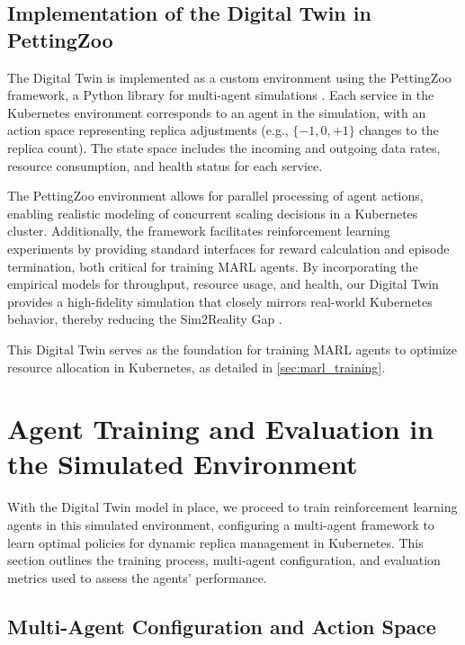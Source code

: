 \documentclass[conference]{IEEEtran}
\begin{document}
\subsection{Implementation of the Digital Twin in PettingZoo}

The Digital Twin is implemented as a custom environment using the PettingZoo framework, a Python library for multi-agent simulations \cite{pettingzoo_framework}. Each service in the Kubernetes environment corresponds to an agent in the simulation, with an action space representing replica adjustments (e.g., $\{-1, 0, +1\}$ changes to the replica count). The state space includes the incoming and outgoing data rates, resource consumption, and health status for each service.

The PettingZoo environment allows for parallel processing of agent actions, enabling realistic modeling of concurrent scaling decisions in a Kubernetes cluster. Additionally, the framework facilitates reinforcement learning experiments by providing standard interfaces for reward calculation and episode termination, both critical for training MARL agents. By incorporating the empirical models for throughput, resource usage, and health, our Digital Twin provides a high-fidelity simulation that closely mirrors real-world Kubernetes behavior, thereby reducing the Sim2Reality Gap \cite{liu_dt_cloud}.

This Digital Twin serves as the foundation for training MARL agents to optimize resource allocation in Kubernetes, as detailed in \autoref{sec:marl_training}.


\section{Agent Training and Evaluation in the Simulated Environment}
\label{sec:marl_training}

With the Digital Twin model in place, we proceed to train reinforcement learning agents in this simulated environment, configuring a multi-agent framework to learn optimal policies for dynamic replica management in Kubernetes. This section outlines the training process, multi-agent configuration, and evaluation metrics used to assess the agents' performance.

\subsection{Multi-Agent Configuration and Action Space}
\end{document}
